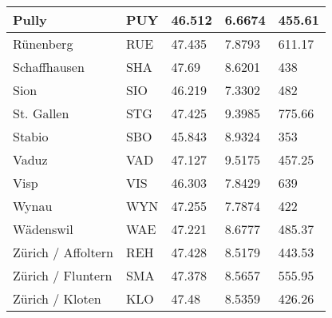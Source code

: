 \begin{table}[!ht]
\begin{tabular}{|l|l|l|l|l|}
        Pully & PUY & 46.512 & 6.6674 & 455.61 \\ \hline
        Rünenberg & RUE & 47.435 & 7.8793 & 611.17 \\ \hline
        Schaffhausen & SHA & 47.69 & 8.6201 & 438 \\ \hline
        Sion & SIO & 46.219 & 7.3302 & 482 \\ \hline
        St. Gallen & STG & 47.425 & 9.3985 & 775.66 \\ \hline
        Stabio & SBO & 45.843 & 8.9324 & 353 \\ \hline
        Vaduz & VAD & 47.127 & 9.5175 & 457.25 \\ \hline
        Visp & VIS & 46.303 & 7.8429 & 639 \\ \hline
        Wynau & WYN & 47.255 & 7.7874 & 422 \\ \hline
        Wädenswil & WAE & 47.221 & 8.6777 & 485.37 \\ \hline
        Zürich / Affoltern & REH & 47.428 & 8.5179 & 443.53 \\ \hline
        Zürich / Fluntern & SMA & 47.378 & 8.5657 & 555.95 \\ \hline
        Zürich / Kloten & KLO & 47.48 & 8.5359 & 426.26 \\ \hline
    \end{tabular}
    \label{hello}
\end{table}